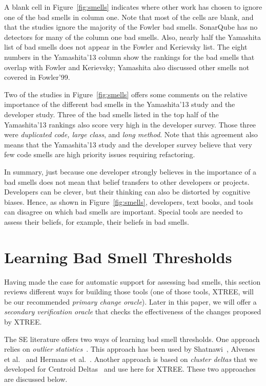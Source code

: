 \documentclass[twocolumn,5p]{elsarticle}
\newcommand{\fig}[1]{Figure~\ref{fig:#1}}
\theoremstyle{break}
\begin{document}
	
	
	
	
	A  blank cell in \fig{smells}
	indicates where   other work has chosen to ignore
	one of the bad smells in column one. 
	Note that most of the cells are blank, and that the studies ignore the majority of the Fowler bad smells.
	SonarQube has no detectors for many of the column one bad smells.
	Also, nearly half the Yamashita list of bad smells
	does not appear in the Fowler and Kerievsky list. The eight numbers
	in the  Yamashita'13 column show the rankings for the bad smells 
	that overlap with Fowler and Kerievsky; Yamashita also discussed other smells not covered in Fowler'99.
	
	
	Two of the studies in \fig{smells} offers some comments on the relative importance
	of the different bad smells in the Yamashita'13 study and the developer study. Three of the bad smells listed in the top half of the Yamashita'13 rankings also score very high in the developer survey. Those three were {\em duplicated code, large class}, 
	and {\em long method}. 
	Note that this agreement also means that the
	Yamashita'13 study and the developer survey   
	believe
	that very few  code smells are   high priority issues
	requiring refactoring. 
	
	In summary, just because one developer strongly believes in the importance of a bad smells does not mean that belief transfers to other developers or projects.
	Developers can be clever, but their thinking can also be distorted
	by cognitive biases.
	Hence, as shown in \fig{smells}, developers, text books, and tools 
	can disagree on which bad smells are important.
	Special tools are needed to assess their beliefs, for example, their beliefs in
	bad smells.  
	
	
	\section{Learning Bad Smell Thresholds}\label{sect:bst}
	
	Having made the case for automatic support for assessing bad smells,
	this section reviews different ways for building those tools (one of those tools,
	XTREE, will be our recommended {\em primary change oracle}).
	Later in this paper, we will offer  a {\em secondary verification oracle}
	that checks the effectiveness of the changes proposed by XTREE.
	
	The SE literature offers two ways of learning bad smell thresholds.
	One approach relies on 
	{\em outlier statistics}~\cite{erni96,bender99}. This approach
	has been used   by Shatnawi~\cite{Shatnawi10}, Alvenes et al.~\cite{Alves2010}
	and Hermans et al.~\cite{hermans15}.
	Another approach is 
	based on {\em cluster deltas} that we developed
	for   Centroid Deltas~\cite{me12c} and 
	use here for XTREE. 
	These two approaches are discussed below. 
	
\end{document}

